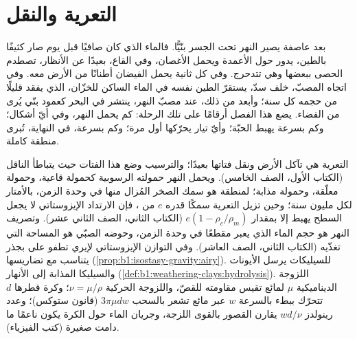 \chapter{التعرية والنقل}\label{ch:b1:erosion-transport}

بعد عاصفة يصير النهر تحت الجسر بنّيًّا. فالماء الذي كان صافيًا قبل يوم صار كثيفًا بالطين، يدور حول الأعمدة ويحمل الأغصان، وفي القاع، بعيدًا عن الأنظار، تصطدم الحصى ببعضها وهي تتدحرج. وفي كل ثانية يحمل الفيضان أطنانًا من الأرض معه. وفي اتجاه المصبّ، خلف سدّ، يستقرّ الطين نفسه في الماء الساكن للخزّان، الذي يفقد قليلًا من حجمه كل سنة؛ وأبعد من ذلك، عند مصبّ النهر، ينتشر في البحر كعمود بنّي يُرى من الفضاء. يضع هذا الفصل أرقامًا على تلك الرحلة: كم يحمل النهر، وفي أيّ أشكال؛ وكم بسرعة يهبط الحبّة؛ وأيّ تيار يحرّكها أول مرة؛ وكم بسرعة، في النهاية، تُبرى منطقة كاملة.

\begin{recall}
التعرية هي تآكل الأرض ونقل فتاتها بعيدًا؛ والترسيب وضع هذا الفتات حيث يتباطأ الناقل (الكتاب الأول، الصف الخامس). ويحمل النهر حمولته الرسوبية كحمولة قاعية، وحمولة معلّقة، وحمولة مذابة؛
 لمنطقة هو سمك الصخر المُزال منها في وحدة الزمن، بالأمتار لكل مليون سنة؛ وحين تزيل التعرية سمكًا قدره $e$ من ، فإن الارتداد الإيزوستاتي لا يجعل السطح يهبط إلا بمقدار $e(1 - \rho_c/\rho_m)$ (الكتاب الثاني، الصف الثاني عشر). وتصريف النهر هو حجم الماء الذي يعبر مقطعًا في وحدة الزمن، وحوضه الصبّي هو المساحة التي تغذّيه (الكتاب الثاني، الصف العاشر).
وفي التوازن الإيزوستاتي لإيري تطفو  على  بجذر يتناسب مع تضاريسها (\cref{prop:b1:isostasy-gravity:airy}).  للسيليكات يرسل الأيونات والسيليكا المذابة إلى الأنهار (\cref{def:b1:weathering-clays:hydrolysis}).
اللزوجة الديناميكية $\mu$ لمائع تقيس مقاومته للقصّ، واللزوجة الحركية $\nu = \mu/\rho$؛ وكرة قطرها $d$ تتحرّك ببطء بالسرعة $w$ عبر مائع تشعر بالسحب $3\pi\mu d w$ (قانون ستوكس)؛ وعدد رينولدز $w d/\nu$ يقارن القصور بالقوى اللزجة، وجريان الماء حول الكرة يكون ناعمًا ما دامت صغيرة (كتب الفيزياء).
\end{recall}

